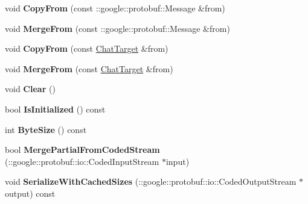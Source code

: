 \begin{DoxyCompactItemize}
\item 
\hypertarget{classSimpleChat_1_1ChatTarget_a94d55ead775ccd548848efefc4e18509}{void {\bfseries Copy\-From} (const \-::google\-::protobuf\-::\-Message \&from)}\label{classSimpleChat_1_1ChatTarget_a94d55ead775ccd548848efefc4e18509}

\item 
\hypertarget{classSimpleChat_1_1ChatTarget_ac65c80b3519e88a89c1531c768f051d4}{void {\bfseries Merge\-From} (const \-::google\-::protobuf\-::\-Message \&from)}\label{classSimpleChat_1_1ChatTarget_ac65c80b3519e88a89c1531c768f051d4}

\item 
\hypertarget{classSimpleChat_1_1ChatTarget_a1852d72c18ee6ca3a6a6237ee6e6e49c}{void {\bfseries Copy\-From} (const \hyperlink{classSimpleChat_1_1ChatTarget}{Chat\-Target} \&from)}\label{classSimpleChat_1_1ChatTarget_a1852d72c18ee6ca3a6a6237ee6e6e49c}

\item 
\hypertarget{classSimpleChat_1_1ChatTarget_aea2cc4d829f43be963fe5e5281c58b88}{void {\bfseries Merge\-From} (const \hyperlink{classSimpleChat_1_1ChatTarget}{Chat\-Target} \&from)}\label{classSimpleChat_1_1ChatTarget_aea2cc4d829f43be963fe5e5281c58b88}

\item 
\hypertarget{classSimpleChat_1_1ChatTarget_a0172176ef83d2e89f8e42e76021b8519}{void {\bfseries Clear} ()}\label{classSimpleChat_1_1ChatTarget_a0172176ef83d2e89f8e42e76021b8519}

\item 
\hypertarget{classSimpleChat_1_1ChatTarget_aa8e4da7087df9548ab7e20909b9b4ccd}{bool {\bfseries Is\-Initialized} () const }\label{classSimpleChat_1_1ChatTarget_aa8e4da7087df9548ab7e20909b9b4ccd}

\item 
\hypertarget{classSimpleChat_1_1ChatTarget_a9437724d77d2202440b3bb4e04f170cf}{int {\bfseries Byte\-Size} () const }\label{classSimpleChat_1_1ChatTarget_a9437724d77d2202440b3bb4e04f170cf}

\item 
\hypertarget{classSimpleChat_1_1ChatTarget_ab35d0ebdf526a521e3022d723abef84b}{bool {\bfseries Merge\-Partial\-From\-Coded\-Stream} (\-::google\-::protobuf\-::io\-::\-Coded\-Input\-Stream $\ast$input)}\label{classSimpleChat_1_1ChatTarget_ab35d0ebdf526a521e3022d723abef84b}

\item 
\hypertarget{classSimpleChat_1_1ChatTarget_a0e9d4cbc640da603feaebccbf1205115}{void {\bfseries Serialize\-With\-Cached\-Sizes} (\-::google\-::protobuf\-::io\-::\-Coded\-Output\-Stream $\ast$output) const }\label{classSimpleChat_1_1ChatTarget_a0e9d4cbc640da603feaebccbf1205115}


\end{DoxyCompactItemize}

